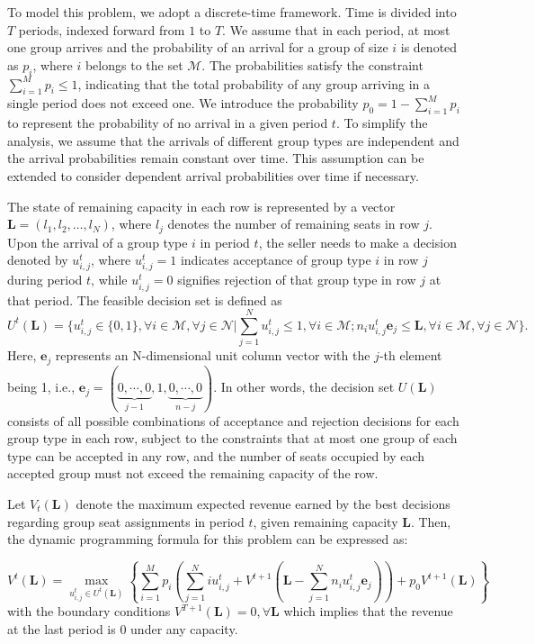 To model this problem, we adopt a discrete-time framework. Time is divided into $T$ periods, indexed forward from $1$ to $T$. We assume that in each period, at most one group arrives and the probability of an arrival for a group of size $i$ is denoted as $p_i$, where $i$ belongs to the set $\mathcal{M}$. The probabilities satisfy the constraint $\sum_{i=1}^M p_i \leq 1$, indicating that the total probability of any group arriving in a single period does not exceed one. We introduce the probability $p_0 = 1 - \sum_{i=1}^{M} p_i$ to represent the probability of no arrival in a given period $t$. To simplify the analysis, we assume that the arrivals of different group types are independent and the arrival probabilities remain constant over time. This assumption can be extended to consider dependent arrival probabilities over time if necessary.

The state of remaining capacity in each row is represented by a vector $\mathbf{L} = (l_1, l_2, \ldots, l_N)$, where $l_j$ denotes the number of remaining seats in row $j$. Upon the arrival of a group type $i$ in period $t$, the seller needs to make a decision denoted by $u_{i,j}^{t}$, where $u_{i,j}^{t} = 1$ indicates acceptance of group type $i$ in row $j$ during period $t$, while $u_{i,j}^{t} = 0$ signifies rejection of that group type in row $j$ at that period. The feasible decision set is defined as $$U^{t}(\mathbf{L}) = \{u_{i,j}^{t} \in \{0,1\}, \forall i \in \mathcal{M}, \forall j \in \mathcal{N} | \sum_{j=1}^{N} u_{i,j}^{t} \leq 1, \forall i \in \mathcal{M}; n_{i}u_{i,j}^{t}\mathbf{e}_j \leq \mathbf{L}, \forall i \in \mathcal{M}, \forall j \in \mathcal{N}\}.$$ Here, $\mathbf{e}_j$ represents an N-dimensional unit column vector with the $j$-th element being 1, i.e., $\mathbf{e}_j = (\underbrace{0, \cdots, 0}_{j-1}, 1, \underbrace{0, \cdots, 0}_{n-j})$. In other words, the decision set $U(\mathbf{L})$ consists of all possible combinations of acceptance and rejection decisions for each group type in each row, subject to the constraints that at most one group of each type can be accepted in any row, and the number of seats occupied by each accepted group must not exceed the remaining capacity of the row.


Let $V_t(\mathbf{L})$ denote the maximum expected revenue earned by the best decisions regarding group seat assignments in period $t$, given remaining capacity $\mathbf{L}$. Then, the dynamic programming formula for this problem can be expressed as:

\begin{equation}\label{DP}
V^{t}(\mathbf{L}) = \max_{u_{i,j}^{t} \in U^{t}(\mathbf{L})}\left\{ \sum_{i=1}^{M} p_i ( \sum_{j=1}^{N} i u_{i,j}^{t} + V^{t+1}(\mathbf{L}- \sum_{j=1}^{N} n_i u_{i,j}^{t}\mathbf{e}_j)) + p_0 V^{t+1}(\mathbf{L})\right\}
\end{equation}
with the boundary conditions $V^{T+1}(\mathbf{L}) = 0, \forall \mathbf{L}$ which implies that the revenue at the last period is 0 under any capacity.

